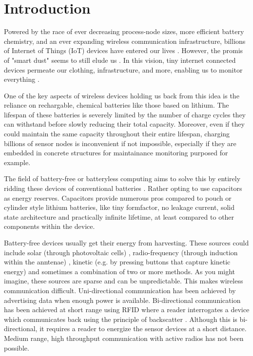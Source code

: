 \chapter{Introduction}
\label{chp:introduction}

\nocite{*}

Powered by the race of ever decreasing process-node sizes, more efficient battery chemistry, and an ever expanding wireless communication infrastructure, billions of Internet of Things (IoT) devices have entered our lives \cite{arif_2021, microsoft_2019}. However, the promis of "smart dust" seems to still elude us \cite{hester_2017}. In this vision, tiny internet connected devices permeate our clothing, infrastructure, and more, enabling us to monitor everything \cite{marr_2018}.

One of the key aspects of wireless devices holding us back from this idea is the reliance on rechargable, chemical batteries like those based on lithium. The lifespan of these batteries is severely limited by the number of charge cycles they can withstand before slowly reducing their total capacity. Moreover, even if they could maintain the same capacity throughout their entire lifespan, charging billions of sensor nodes is inconvenient if not impossible, especially if they are embedded in concrete structures for maintainance monitoring purposed for example.

The field of battery-free or batteryless computing aims to solve this by entirely ridding these devices of conventional batteries \cite{freebie, hester_2017, satya_2019}. Rather opting to use capacitors as energy reserves. Capacitors provide numerous pros compared to pouch or cylinder style lithium batteries, like tiny formfactor, no leakage current, solid state architecture and practically infinite lifetime, at least compared to other components within the device. 

Battery-free devices usually get their energy from harvesting. These sources could include solar (through photovoltaic cells) \cite{gameboy, colin_2018}, radio-frequency (through induction within the anntenae) \cite{gollakota_2014, wisp_2005}, kinetic (e.g. by pressing buttons that capture kinetic energy) \cite{gameboy} and sometimes a combination of two or more methods. As you might imagine, these sources are sparse and can be unpredictable. This makes wireless communication difficult. Uni-directional communication has been achieved by advertising data when enough power is available. Bi-directional communication has been achieved at short range using RFID where a reader interrogates a device which communicates back using the principle of backscatter \cite{wisp_2005}. Although this is bi-directional, it requires a reader to energize the sensor devices at a short distance. Medium range, high throughput communication with active radios has not been possible.


